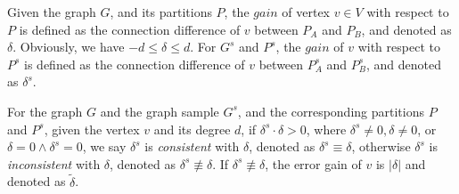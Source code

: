 \documentclass{sig-alternate-2013}
\begin{document}
\begin{definition}\label{def-gain}
 Given the graph $G$, and its partitions $P$, the $gain$ of vertex $v \in V$ with respect to $P$ is defined as the connection difference of $v$ between $P_A$ and $P_B$, and denoted as $\delta$.
 Obviously, we have $-d\leq\delta\leq d$. For $G^s$ and $P^s$, the $gain$ of $v$ with respect to $P^s$ is defined as the connection difference of $v$ between $P_A^s$ and $P_B^s$, and  denoted as $\delta^s$.
\end{definition}

\begin{definition}\label{def-inconsistgain}
For the graph $G$ and the graph sample $G^s$, and the corresponding partitions $P$ and $P^s$, given the vertex $v$ and its degree $d$, 
if $\delta^s \cdot \delta >0$, where $\delta^s \neq 0, \delta \neq 0$, or $\delta=0 \land \delta^s =0$, 
we say $\delta^s$ is \textit{consistent} with $\delta$, denoted as  $\delta^s \equiv \delta $, 
otherwise  $\delta^s$ is \textit{inconsistent} with $\delta$, denoted as $\delta^s \not\equiv \delta $. 
If $\delta^s \not\equiv \delta $, the error gain of $v$ is $ |\delta| $ and denoted as $\tilde\delta$.
\end{definition}
\end{document}
